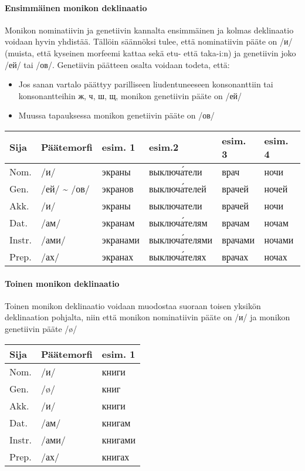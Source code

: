 \documentclass[]{scrartcl}
\providecommand{\tightlist}{%
  \setlength{\itemsep}{0pt}\setlength{\parskip}{0pt}}
\begin{document}
\paragraph{Ensimmäinen monikon
deklinaatio}\label{ensimmuxe4inen-monikon-deklinaatio}

Monikon nominatiivin ja genetiivin kannalta ensimmäinen ja kolmas
deklinaatio voidaan hyvin yhdistää. Tällöin säännöksi tulee, että
nominatiivin pääte on /и/ (muista, että kyseinen morfeemi kattaa sekä
etu- että taka-i:n) ja genetiivin joko /ей/ tai /ов/. Genetiivin
päätteen osalta voidaan todeta, että:

\begin{itemize}
\tightlist
\item
  Jos sanan vartalo päättyy parilliseen liudentuneeseen konsonanttiin
  tai konsonantteihin ж, ч, ш, щ, monikon genetiivin pääte on /ей/
\item
  Muussa tapauksessa monikon genetiivin pääte on /ов/
\end{itemize}

\begin{longtable}[c]{@{}llllll@{}}
\toprule
Sija & Päätemorfi & esim. 1 & esim.2 & esim. 3 & esim. 4\tabularnewline
\midrule
\endhead
Nom. & /и/ & экраны & выключа́тели & врач & ночи\tabularnewline
Gen. & /ей/ \textasciitilde{} /ов/ & экранов & выключа́телей & врачей &
ночей\tabularnewline
Akk. & /и/ & экраны & выключатели & врачей & ночи\tabularnewline
Dat. & /ам/ & экранам & выключа́телям & врачам & ночам\tabularnewline
Instr. & /ами/ & экранами & выключа́телями & врачами &
ночами\tabularnewline
Prep. & /ах/ & экранах & выключа́телях & врачах & ночах\tabularnewline
\bottomrule
\end{longtable}

\paragraph{Toinen monikon deklinaatio}\label{toinen-monikon-deklinaatio}

Toinen monikon deklinaatio voidaan muodostaa suoraan toisen yksikön
deklinaation pohjalta, niin että monikon nominatiivin pääte on /и/ ja
monikon genetiivin pääte /ø/

\begin{longtable}[c]{@{}lll@{}}
\toprule
Sija & Päätemorfi & esim. 1\tabularnewline
\midrule
\endhead
Nom. & /и/ & книги\tabularnewline
Gen. & /ø/ & книг\tabularnewline
Akk. & /и/ & книги\tabularnewline
Dat. & /ам/ & книгам\tabularnewline
Instr. & /ами/ & книгами\tabularnewline
Prep. & /ах/ & книгах\tabularnewline
\bottomrule
\end{longtable}
\end{document}
